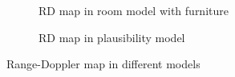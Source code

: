 \documentclass[12pt,DIV14,BCOR12mm,a4paper,footinclude=false,headinclude,parskip=half-,twoside,openright,cleardoublepage=empty,toc=index,bibliography=totoc,listof=totoc]{scrreprt}
\numberwithin{equation}{chapter}
\begin{document}
\begin{figure}[t]
\begin{subfigure}{0.45\textwidth}
        \centering
        \caption{RD map in room model with furniture}
    \end{subfigure}\hspace{0.5cm}
    \begin{subfigure}{0.45\textwidth}
        \centering
        \caption{RD map in plausibility model}
    \end{subfigure}
    \caption{Range-Doppler map in different models}
    \label{range doppler map in different models}
\end{figure}
\end{document}
